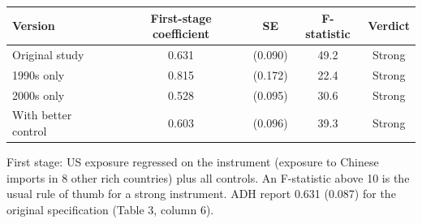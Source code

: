 \begin{tabular}{lcccc}
\toprule
Version & First-stage coefficient & SE & F-statistic & Verdict \\
\midrule
Original study & 0.631 & (0.090) & 49.2 & Strong \\
1990s only & 0.815 & (0.172) & 22.4 & Strong \\
2000s only & 0.528 & (0.095) & 30.6 & Strong \\
With better control & 0.603 & (0.096) & 39.3 & Strong \\
\bottomrule
\end{tabular}

{\tiny First stage: US exposure regressed on the instrument (exposure to Chinese imports in 8 other rich countries) plus all controls. An F-statistic above 10 is the usual rule of thumb for a strong instrument. ADH report 0.631 (0.087) for the original specification (Table 3, column 6).}
